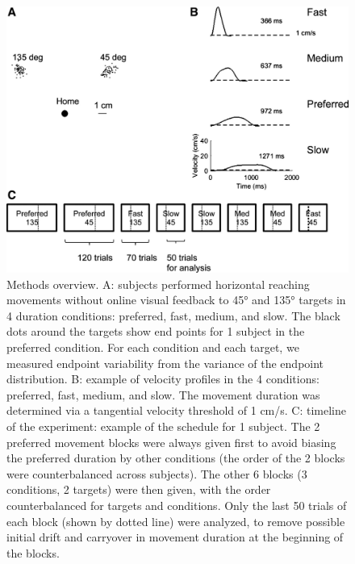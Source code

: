 \begin{figure}
	\centering
	\includegraphics[width=0.8\linewidth]{figures/MT-experiment}
	\caption[Methods overview]{Methods overview. A: subjects performed horizontal reaching movements without online visual feedback to 45° and 135° targets in 4 duration conditions: preferred, fast, medium, and slow. The black dots around the targets show end points for 1 subject in the preferred condition. For each condition and each target, we measured endpoint variability from the variance of the endpoint distribution. B: example of velocity profiles in the 4 conditions: preferred, fast, medium, and slow. The movement duration was determined via a tangential velocity threshold of 1 cm/s. C: timeline of the experiment: example of the schedule for 1 subject. The 2 preferred movement blocks were always given first to avoid biasing the preferred duration by other conditions (the order of the 2 blocks were counterbalanced across subjects). The other 6 blocks (3 conditions, 2 targets) were then given, with the order counterbalanced for targets and conditions. Only the last 50 trials of each block (shown by dotted line) were analyzed, to remove possible initial drift and carryover in movement duration at the beginning of the blocks.}
	\label{fig:mt-experiment}
\end{figure}

